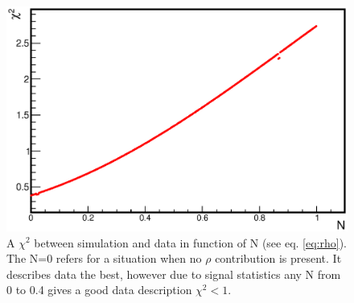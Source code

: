 \begin{figure}[ht]
  \centering
  \includegraphics[width=0.9 \linewidth]{Chapter_analysis/chi2.eps}
  \caption{A $\chi^2$ between simulation and data in function of N (see eq. \ref{eq:rho}). The N=0 refers for a situation when no $\rho$ contribution is present. It describes data the best, however due to signal statistics any N from 0 to 0.4 gives a good data description $\chi^2<1$.}
  \label{fig:chi2}
\end{figure}
